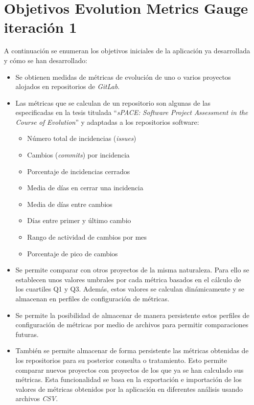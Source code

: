\section{Objetivos Evolution Metrics Gauge iteración 1}
A continuación se enumeran los objetivos iniciales de la aplicación ya desarrollada y cómo se han desarrollado: \cite{TFGPrevio}
\begin{itemize}
	\tightlist
	\item Se obtienen medidas de métricas de evolución de uno o varios proyectos alojados en repositorios de \textit{GitLab}.
	\item Las métricas que se calculan de un repositorio  son algunas de las especificadas en la tesis titulada ``\textit{sPACE: Software Project Assessment in the Course of Evolution}'' \cite{ratzinger_space:_2007} y 
	adaptadas a los repositorios software:
	\begin{itemize}
		\tightlist
		\item Número total de incidencias (\textit{issues})
		\item Cambios (\textit{commits}) por incidencia
		\item Porcentaje de incidencias cerrados
		\item Media de días en cerrar una incidencia
		\item Media de días entre cambios
		\item Días entre primer y último cambio
		\item Rango de actividad de cambios por mes
		\item Porcentaje de pico de cambios
	\end{itemize}
	\item Se permite comparar con otros proyectos de la misma naturaleza. Para ello se establecen unos valores umbrales por cada métrica basados en el cálculo de los cuartiles Q1 y Q3. Además, estos valores se calculan dinámicamente y se almacenan en perfiles de configuración de métricas.
	\item Se permite la posibilidad de almacenar de manera persistente estos perfiles de configuración de métricas por medio de archivos para permitir comparaciones futuras.
	\item También se permite almacenar de forma persistente las métricas obtenidas de los repositorios para su posterior consulta o tratamiento. Esto permite comparar nuevos proyectos con proyectos de los que ya se han calculado sus métricas.
	 Esta funcionalidad se basa en la exportación e importación de los valores de métricas obtenidos por la aplicación en diferentes análisis usando archivos \textit{CSV}.
\end{itemize}



